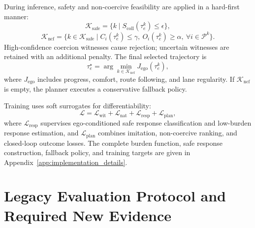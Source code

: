 \documentclass[10pt]{article}
\begin{document}
During inference, safety and non-coercive feasibility are applied in a hard-first manner:
\begin{equation}
    \mathcal{K}_{\mathrm{safe}}
    =
    \{k \mid S_{\mathrm{coll}}(\tau^k_e)\le \epsilon \},
\end{equation}
\begin{equation}
    \mathcal{K}_{\mathrm{ncf}}
    =
    \{k\in\mathcal{K}_{\mathrm{safe}}
    \mid
    C_i(\tau^k_e)\le \gamma,\ 
    O_i(\tau^k_e)\ge \alpha,\ 
    \forall i\in\mathcal{P}^k
    \}.
\end{equation}
High-confidence coercion witnesses cause rejection; uncertain witnesses are retained with an additional penalty. The final selected trajectory is
\begin{equation}
    \tau^\star_e
    =
    \arg\min_{k\in\mathcal{K}_{\mathrm{ncf}}}
    J_{\mathrm{ego}}(\tau^k_e),
\end{equation}
where $J_{\mathrm{ego}}$ includes progress, comfort, route following, and lane regularity. If $\mathcal{K}_{\mathrm{ncf}}$ is empty, the planner executes a conservative fallback policy.

Training uses soft surrogates for differentiability:
\begin{equation}
    \mathcal{L}
    =
    \mathcal{L}_{\mathrm{wit}}
    +
    \mathcal{L}_{\mathrm{nat}}
    +
    \mathcal{L}_{\mathrm{resp}}
    +
    \mathcal{L}_{\mathrm{plan}},
\end{equation}
where $\mathcal{L}_{\mathrm{resp}}$ supervises ego-conditioned safe response classification and low-burden response estimation, and $\mathcal{L}_{\mathrm{plan}}$ combines imitation, non-coercive ranking, and closed-loop outcome losses. The complete burden function, safe response construction, fallback policy, and training targets are given in Appendix~\ref{app:implementation_details}.



\section{Legacy Evaluation Protocol and Required New Evidence}
\label{sec:experiments}
\end{document}

